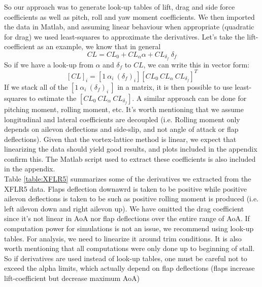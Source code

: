 \documentclass[titlepage,10pt]{article}
\begin{document}
So our approach was to generate look-up tables of lift, drag and side force coefficients as well as pitch, roll and yaw moment coefficients. We then imported the data in Matlab, and assuming linear behaviour when appropriate (quadratic for drag) we used least-squares to approximate the derivatives. Let's take the lift-coefficient as an example, we know that in general $$CL = CL_0 + CL_{\alpha} \alpha + CL_{\delta_{f}}\ \delta_f$$ So if we have a look-up from $\alpha$ and $\delta_f$ to $CL$, we can write this in vector form: $$\left[CL\right]_i =  \left[1\ \alpha_i\  (\delta_f)_i  \right] \left[ CL_0\ CL_{\alpha}\ CL_{\delta_{f}}\right]^T$$ If we stack all of the $\left[1\ \alpha_i\  (\delta_f)_i\  \right]$ in a matrix, it is then possible to use least-squares to estimate the $\left[ CL_0\ CL_{\alpha}\ CL_{\delta_{f}}\right]$. A similar approach can be done for pitching moment, rolling moment, etc. It's worth mentioning that we assume longitudinal and lateral coefficients are decoupled (i.e. Rolling moment only depends on ailevon deflections and side-slip, and not angle of attack or flap deflections). Given that the vortex-lattice method is linear, we expect that linearizing the data should yield good results, and plots included in the appendix confirm this. The Matlab script used to extract these coefficients is also included in the appendix.\\

Table \ref{table:XFLR5} summarizes some of the derivatives we extracted from the XFLR5 data. Flaps deflection downawrd is taken to be positive while positive ailevon deflections is taken to be such as positive rolling moment is produced (i.e. left ailevon down and right ailevon up). We have omitted the drag coefficient since it's not linear in AoA nor flap deflections over the entire range of AoA. If computation power for simulations is not an issue, we recommend using look-up tables. For analysis, we need to linearize it around trim conditions. It is also worth mentioning that all computations were only done up to beginning of stall. So if derivatives are used instead of look-up tables, one must be careful not to exceed the alpha limits, which actually depend on flap deflections (flaps increase lift-coefficient but decrease maximum AoA)
\end{document}
